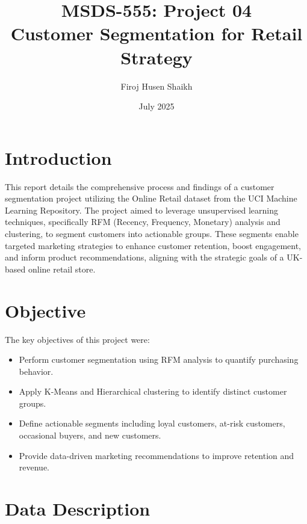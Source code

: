 \documentclass[a4paper,12pt]{article}
\begin{document}
\title{MSDS-555: Project 04 \\ Customer Segmentation for Retail Strategy}
\author{Firoj Husen Shaikh}
\date{July 2025}
\maketitle

\section{Introduction}

This report details the comprehensive process and findings of a customer segmentation project utilizing the Online Retail dataset from the UCI Machine Learning Repository. The project aimed to leverage unsupervised learning techniques, specifically RFM (Recency, Frequency, Monetary) analysis and clustering, to segment customers into actionable groups. These segments enable targeted marketing strategies to enhance customer retention, boost engagement, and inform product recommendations, aligning with the strategic goals of a UK-based online retail store.

\section{Objective}

The key objectives of this project were:
\begin{itemize}
    \item Perform customer segmentation using RFM analysis to quantify purchasing behavior.
    \item Apply K-Means and Hierarchical clustering to identify distinct customer groups.
    \item Define actionable segments including loyal customers, at-risk customers, occasional buyers, and new customers.
    \item Provide data-driven marketing recommendations to improve retention and revenue.
\end{itemize}

\section{Data Description}
\end{document}
